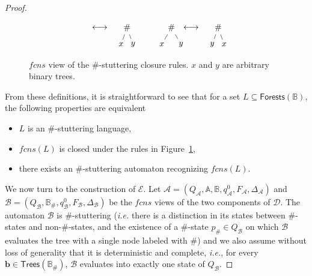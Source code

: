 \documentclass{CSML}
\newcommand\A{\ensuremath{\mathbb{A}}\xspace}
\newcommand\B{\mathbb{B}}
\newcommand\Aa{\mathcal{A}}
\newcommand\Ba{\mathcal{B}}
\newcommand\Da{\mathcal{D}}
\newcommand\Ea{\mathcal{E}}
\newcommand\Trees{\mathsf{Trees}}
\newcommand\Forests{\mathsf{Forests}}
\newcommand\btree{\boldsymbol{b}}
\newcommand\fcns{\ensuremath{\mathit{fcns}}\xspace}
\newcommand{\toto}{\longleftrightarrow}
\begin{document}
\begin{proof}
\begin{figure}
\[\begin{array}{rclcrclcrclrclc}
\begin{minipage}[t]{10mm}
\end{minipage}
&
\vspace{-0mm}\,\,\toto
&
\begin{minipage}[t]{10mm}
\vspace{-3.5mm}
\begin{tikzpicture}
  [level distance=7mm,
   level 1/.style={sibling distance=5mm}]
\node {$\#$}
 child { node {$x$} }
 child { node {$y$} };
\end{tikzpicture}
\end{minipage}
& & 
\begin{minipage}[t]{10mm}
\vspace{-3.5mm}
\begin{tikzpicture}
  [level distance=7mm,
   level 1/.style={sibling distance=8mm},
   level 2/.style={sibling distance=5mm}]
\node {$\#$}
 child { node {$x$} }
 child { node {$y$}};
\end{tikzpicture}
\end{minipage}
&
\vspace{-0mm}\!\!\!\!\toto
&
\begin{minipage}[t]{10mm}
\vspace{-3.5mm}
\begin{tikzpicture}
  [level distance=7mm,
   level 1/.style={sibling distance=5mm}]
\node {$\#$}
 child { node {$y$} }
 child { node {$x$} };
\end{tikzpicture}
\end{minipage}
\end{array}
\]
\caption{\fcns view of the $\#$-stuttering closure rules. $x$ and $y$ are
  arbitrary binary trees.}
\label{fig-rules-fcns}
\end{figure}

\noindent From these definitions, it is straightforward to see that 
for a set $L \subseteq \Forests(\B)$, the following properties are equivalent
\begin{itemize}
\item $L$ is an $\#$-stuttering language,
\item $\fcns(L)$ is closed under the rules in Figure~\ref{fig-rules-fcns},
\item there exists an $\#$-stuttering automaton recognizing $\fcns(L)$.
\end{itemize}

\medskip

We now turn to the construction of $\Ea$.
Let $\Aa = (Q_\Aa, \A, \B, q^0_{\Aa}, F_\Aa, \Delta_\Aa)$ 
and $\Ba = (Q_\Ba, \B_\#, q^0_{\Ba}, F_\Ba, \Delta_\Ba)$
be the $\fcns$ views of the two components of $\Da$.
The automaton $\Ba$ is $\#$-stuttering (\textit{i.e.} there is a distinction in its
states between $\#$-states and non-$\#$-states, and the existence of a
$\#$-state $p_\# \in Q_\Ba$ on which $\Ba$ evaluates the tree with a single
node labeled with $\#$) and we also assume without loss of generality that it
is deterministic and complete, \textit{i.e.}, for every $\btree \in
\Trees(\B_\#)$, $\Ba$ evaluates into exactly one state of $Q_\Ba$.


\end{proof}
\end{document}
